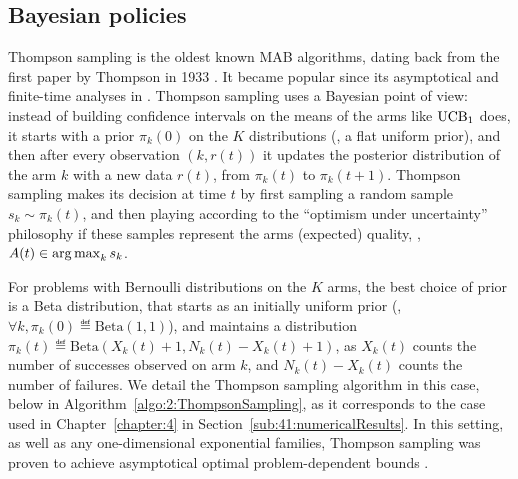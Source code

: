 

\subsection{Bayesian policies}
\label{sub:2:BayesianPolicies}



Thompson sampling is the oldest known MAB algorithms, dating back from the first paper by Thompson in 1933 \cite{Thompson33}.
It became popular since its asymptotical and finite-time analyses in \cite{AgrawalGoyal11,Kaufmann12Thompson}.
%
Thompson sampling uses a Bayesian point of view:
instead of building confidence intervals on the means of the arms like $\mathrm{UCB}_1$ does,
it starts with a prior $\pi_k(0)$ on the $K$ distributions (\eg, a flat uniform prior), and then after every observation $(k, r(t))$ it updates the posterior distribution of the arm $k$ with a new data $r(t)$, from $\pi_k(t)$ to $\pi_k(t+1)$.
Thompson sampling makes its decision at time $t$ by first sampling a random sample $s_k \sim \pi_k(t)$, and then playing according to the ``optimism under uncertainty'' philosophy if these samples represent the arms (expected) quality, \ie, $A(t) \in \operatorname*{arg\,max}_k s_k$.

For problems with Bernoulli distributions on the $K$ arms,
the best choice of prior is a Beta distribution, that starts as an initially uniform prior (\ie, $\forall k, \pi_k(0) \eqdef \mathrm{Beta}(1,1)$),
and maintains a distribution $\pi_k(t) \eqdef \mathrm{Beta}(X_k(t)+1,N_k(t)-X_k(t)+1)$,
as $X_k(t)$ counts the number of successes observed on arm $k$, and $N_k(t)-X_k(t)$ counts the number of failures.
%
We detail the Thompson sampling algorithm in this case, below in Algorithm~\ref{algo:2:ThompsonSampling}, as it corresponds to the case used in Chapter~\ref{chapter:4} in Section~\ref{sub:41:numericalResults}.
%
In this setting, as well as any one-dimensional exponential families,
Thompson sampling was proven to achieve asymptotical optimal problem-dependent bounds \cite{Kaufmann12Thompson,AgrawalGoyal11}.


